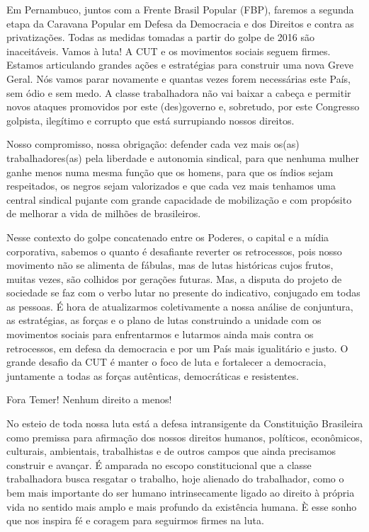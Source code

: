 Em Pernambuco, juntos com a Frente Brasil Popular (FBP), faremos a
segunda etapa da Caravana Popular em Defesa da Democracia e dos Direitos
e contra as privatizações. Todas as medidas tomadas a partir do golpe de
2016 são inaceitáveis. Vamos à luta! A CUT e os movimentos sociais
seguem firmes. Estamos articulando grandes ações e estratégias para
construir uma nova Greve Geral. Nós vamos parar novamente e quantas
vezes forem necessárias este País, sem ódio e sem medo. A classe
trabalhadora não vai baixar a cabeça e permitir novos ataques promovidos
por este (des)governo e, sobretudo, por este Congresso golpista,
ilegítimo e corrupto que está surrupiando nossos direitos.

Nosso compromisso, nossa obrigação: defender cada vez mais os(as)
trabalhadores(as) pela liberdade e autonomia sindical, para que nenhuma
mulher ganhe menos numa mesma função que os homens, para que os índios
sejam respeitados, os negros sejam valorizados e que cada vez mais
tenhamos uma central sindical pujante com grande capacidade de
mobilização e com propósito de melhorar a vida de milhões de
brasileiros.

Nesse contexto do golpe concatenado entre os Poderes, o capital e a
mídia corporativa, sabemos o quanto é desafiante reverter os
retrocessos, pois nosso movimento não se alimenta de fábulas, mas de
lutas históricas cujos frutos, muitas vezes, são colhidos por gerações
futuras. Mas, a disputa do projeto de sociedade se faz com o verbo lutar
no presente do indicativo, conjugado em todas as pessoas. É hora de
atualizarmos coletivamente a nossa análise de conjuntura, as
estratégias, as forças e o plano de lutas construindo a unidade com os
movimentos sociais para enfrentarmos e lutarmos ainda mais contra os
retrocessos, em defesa da democracia e por um País mais igualitário e
justo. O grande desafio da CUT é manter o foco de luta e fortalecer a
democracia, juntamente a todas as forças autênticas, democráticas e
resistentes.

Fora Temer! Nenhum direito a menos!

No esteio de toda nossa luta está a defesa intransigente da Constituição
Brasileira como premissa para afirmação dos nossos direitos humanos,
políticos, econômicos, culturais, ambientais, trabalhistas e de outros
campos que ainda precisamos construir e avançar. É amparada no escopo
constitucional que a classe trabalhadora busca resgatar o trabalho, hoje
alienado do trabalhador, como o bem mais importante do ser humano
intrinsecamente ligado ao direito à própria vida no sentido mais amplo e
mais profundo da existência humana. È esse sonho que nos inspira fé e
coragem para seguirmos firmes na luta.

